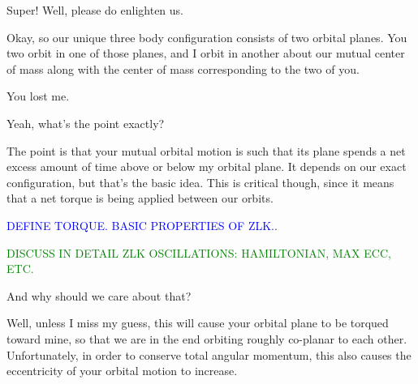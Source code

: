 \documentclass[main.tex]{subfiles}
\begin{document}
\par \Taygete  Super!  Well, please do enlighten us.

\par \Celaeno  Okay, so our unique three body configuration consists of two orbital planes.  You two orbit in one of those planes, and I orbit in another about our mutual center of mass along with the center of mass corresponding to the two of you.

\par \Alcyone  You lost me.

\par \Taygete Yeah, what's the point exactly?

\par \Celaeno The point is that your mutual orbital motion is such that its plane spends a net excess amount of time above or below my orbital plane.  It depends on our exact configuration, but that's the basic idea.  This is critical though, since it means that a net torque is being applied between our orbits.


\begin{tcolorbox}[sharp corners, colback=blue!30, colframe=blue!80!blue, title=Orbital dynamics IIIb]
\par \textcolor{blue}{DEFINE TORQUE. BASIC PROPERTIES OF ZLK.}.  
\end{tcolorbox}

\begin{tcolorbox}[sharp corners, colback=green!30, colframe=green!80!blue, title=Orbital Dynamics IIIc]
\par \textcolor{green}{DISCUSS IN DETAIL ZLK OSCILLATIONS: HAMILTONIAN, MAX ECC, ETC.}
\end{tcolorbox}


\par \Alcyone And why should we care about that?

\par \Celaeno Well, unless I miss my guess, this will cause your orbital plane to be torqued toward mine, so that we are in the end orbiting roughly co-planar to each other.  Unfortunately, in order to conserve total angular momentum, this also causes the eccentricity of your orbital motion to increase.  
\end{document}
